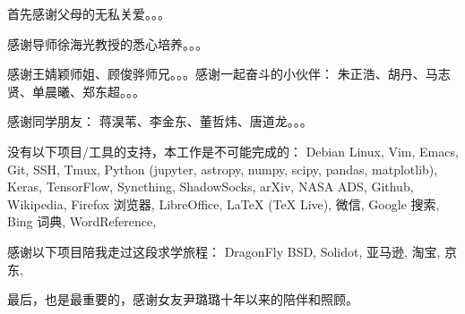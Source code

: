
\begin{thanks}

首先感谢父母的无私关爱。。。

感谢导师徐海光教授的悉心培养。。。

感谢王婧颖师姐、顾俊骅师兄。。。感谢一起奋斗的小伙伴：
朱正浩、胡丹、马志贤、单晨曦、郑东超。。。

感谢同学朋友：
蒋淏苇、李金东、董哲炜、唐道龙。。。

没有以下项目/工具的支持，本工作是不可能完成的：
Debian Linux,
Vim,
Emacs,
Git,
SSH,
Tmux,
Python (jupyter, astropy, numpy, scipy, pandas, matplotlib),
Keras,
TensorFlow,
Syncthing,
ShadowSocks,
arXiv,
NASA ADS,
Github,
Wikipedia,
Firefox 浏览器,
LibreOffice,
\LaTeX{} (\TeX{} Live),
微信,
Google 搜索,
Bing 词典,
WordReference,

感谢以下项目陪我走过这段求学旅程：
DragonFly BSD,
Solidot,
亚马逊,
淘宝,
京东,

最后，也是最重要的，感谢女友尹璐璐十年以来的陪伴和照顾。

\end{thanks}
